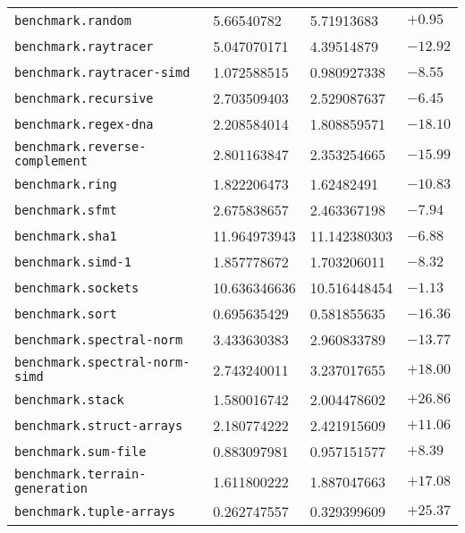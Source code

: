 \begin{longtable}{llll}
\texttt{benchmark.random}                   & 5.66540782        & 5.71913683          & $+0.95$     \\
\texttt{benchmark.raytracer}                & 5.047070171       & 4.39514879          & $-12.92$    \\
\texttt{benchmark.raytracer-simd}           & 1.072588515       & 0.980927338         & $-8.55$     \\
\texttt{benchmark.recursive}                & 2.703509403       & 2.529087637         & $-6.45$     \\
\texttt{benchmark.regex-dna}                & 2.208584014       & 1.808859571         & $-18.10$    \\
\texttt{benchmark.reverse-complement}       & 2.801163847       & 2.353254665         & $-15.99$    \\
\texttt{benchmark.ring}                     & 1.822206473       & 1.62482491          & $-10.83$    \\
\texttt{benchmark.sfmt}                     & 2.675838657       & 2.463367198         & $-7.94$     \\
\texttt{benchmark.sha1}                     & 11.964973943      & 11.142380303        & $-6.88$     \\
\texttt{benchmark.simd-1}                   & 1.857778672       & 1.703206011         & $-8.32$     \\
\texttt{benchmark.sockets}                  & 10.636346636      & 10.516448454        & $-1.13$     \\
\texttt{benchmark.sort}                     & 0.695635429       & 0.581855635         & $-16.36$    \\
\texttt{benchmark.spectral-norm}            & 3.433630383       & 2.960833789         & $-13.77$    \\
\texttt{benchmark.spectral-norm-simd}       & 2.743240011       & 3.237017655         & $+18.00$    \\
\texttt{benchmark.stack}                    & 1.580016742       & 2.004478602         & $+26.86$    \\
\texttt{benchmark.struct-arrays}            & 2.180774222       & 2.421915609         & $+11.06$    \\
\texttt{benchmark.sum-file}                 & 0.883097981       & 0.957151577         & $+8.39$     \\
\texttt{benchmark.terrain-generation}       & 1.611800222       & 1.887047663         & $+17.08$    \\
\texttt{benchmark.tuple-arrays}             & 0.262747557       & 0.329399609         & $+25.37$    \\

\end{longtable}

